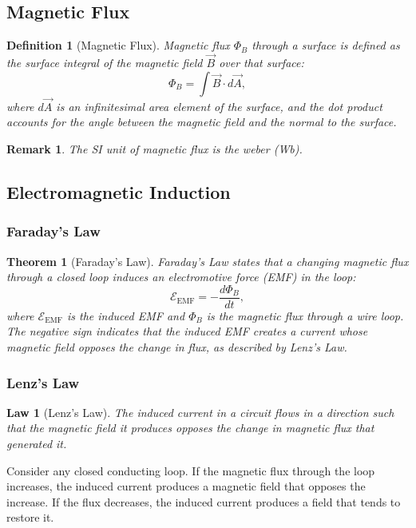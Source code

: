 \documentclass{article}
\newtheorem{theorem}{Theorem}
\newtheorem{law}{Law}
\newtheorem{definition}{Definition}
\newtheorem{remark}{Remark}
\begin{document}
\subsection{Magnetic Flux}
\begin{definition}[Magnetic Flux]
    Magnetic flux $\Phi_B$ through a surface is defined as the surface integral of the magnetic field $\vec{B}$ over that surface:
    \[\Phi_B = \int \vec{B} \cdot d\vec{A},\]
    where $d\vec{A}$ is an infinitesimal area element of the surface, and the dot product accounts for the angle between the magnetic field and the normal to the surface.
\end{definition}
\begin{remark}
    The SI unit of magnetic flux is the weber (Wb).
\end{remark}

\subsection{Electromagnetic Induction}

\subsubsection{Faraday's Law}
\begin{theorem}[Faraday's Law]
    Faraday's Law states that a changing magnetic flux through a closed loop induces an electromotive force (EMF) in the loop:
    \[\mathcal{E}_{\text{EMF}} = -\frac{d\Phi_B}{dt},\]
    where $\mathcal{E}_{\text{EMF}}$ is the induced EMF and $\Phi_B$ is the magnetic flux through a wire loop. The negative sign indicates that the induced EMF creates a current whose magnetic field opposes the change in flux, as described by Lenz's Law.
\end{theorem}

\subsubsection{Lenz's Law}
\begin{law}[Lenz's Law]
    The induced current in a circuit flows in a direction such that the magnetic field it produces opposes the change in magnetic flux that generated it.
\end{law}
Consider any closed conducting loop. If the magnetic flux through the loop increases, the induced current produces a magnetic field that opposes the increase. If the flux decreases, the induced current produces a field that tends to restore it.
\end{document}
